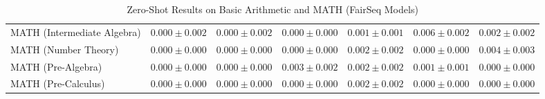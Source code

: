 \documentclass[11pt]{article}
\begin{document}
{\begin{landscape}
\begin{table}
\begin{tabular}{l c c c c c c }
MATH (Intermediate Algebra) & $0.000 \pm 0.002$ & $0.000 \pm 0.002$ & $0.000 \pm 0.000$ & $0.001 \pm 0.001$ & $0.006 \pm 0.002$ & $0.002 \pm 0.002$ \\ 
MATH (Number Theory) & $0.000 \pm 0.000$ & $0.000 \pm 0.000$ & $0.000 \pm 0.000$ & $0.002 \pm 0.002$ & $0.000 \pm 0.000$ & $0.004 \pm 0.003$ \\ 
MATH (Pre-Algebra) & $0.000 \pm 0.000$ & $0.000 \pm 0.000$ & $0.003 \pm 0.002$ & $0.002 \pm 0.002$ & $0.001 \pm 0.001$ & $0.000 \pm 0.000$ \\ 
MATH (Pre-Calculus) & $0.000 \pm 0.000$ & $0.000 \pm 0.000$ & $0.000 \pm 0.000$ & $0.002 \pm 0.002$ & $0.000 \pm 0.000$ & $0.000 \pm 0.000$ \\ 
\bottomrule 
\end{tabular}
\caption{Zero-Shot Results on Basic Arithmetic and MATH (FairSeq Models)}
\label{tab:math_fairseq}
\end{table}



\end{landscape}}
\end{document}
